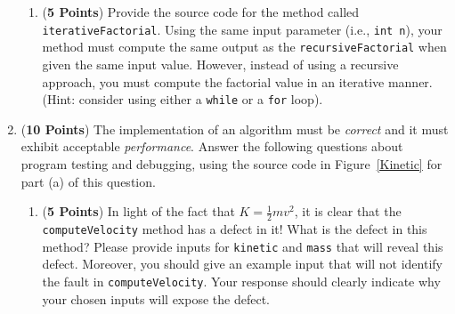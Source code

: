 \documentclass[12pt]{article}
\begin{document}
\begin{enumerate}
\begin{enumerate}

\item ({\bf 5 Points}) Provide the source code for the method called {\tt iterativeFactorial}.  Using the same input
  parameter (i.e., {\tt int n}), your method must compute the same output as the {\tt recursiveFactorial} when given the
  same input value.  However, instead of using a recursive approach, you must compute the factorial value in an
  iterative manner.  (Hint: consider using either a {\tt while} or a {\tt for} loop).


\end{enumerate}

\newpage


\item ({\bf 10 Points}) The implementation of an algorithm must be
  {\em correct} and it must exhibit acceptable {\em performance}.
  Answer the following questions about program testing and debugging,
  using the source code in Figure~\ref{Kinetic} for part (a) of this
  question.

\begin{enumerate}
  
\item ({\bf 5 Points}) In light of the fact that $K =
  \frac{1}{2}mv^2$, it is clear that the {\tt computeVelocity} method
  has a defect in it!  What is the defect in this method?  Please
  provide inputs for {\tt kinetic} and {\tt mass} that will reveal
  this defect.  Moreover, you should give an example input that will
  not identify the fault in {\tt computeVelocity}.  Your response
  should clearly indicate why your chosen inputs will expose the
  defect.


\end{enumerate}
\end{enumerate}
\end{document}
